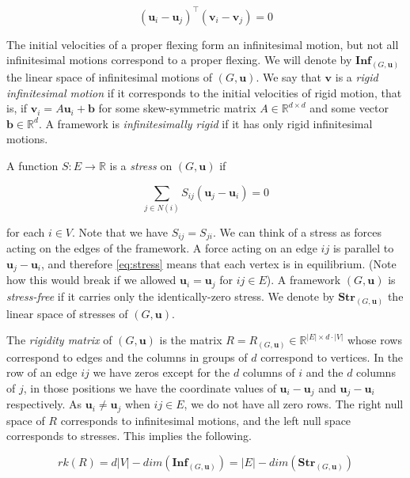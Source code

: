 \documentclass[10pt,a4paper]{article}
\newcommand{\vu}[0]{\mathbf{u}}
\newcommand{\vv}[0]{\mathbf{v}}
\newcommand{\R}[0]{\mathbb{R}}
\begin{document}
\begin{equation}\label{eq:infinitesimal}
    (\vu_i-\vu_j)^\top (\vv_i -\vv_j)=0
\end{equation}

The initial velocities of a proper flexing form an infinitesimal motion, but not all infinitesimal motions correspond to a proper flexing. We will denote by $\mathbf{Inf}_{(G,\vu)}$ the linear space of infinitesimal motions of $(G,\vu)$. We say that $\vv$ is a \emph{rigid infinitesimal motion} if it corresponds to the initial velocities of rigid motion, that is, if $\vv_i=A\vu_i+\mathbf{b}$
for some skew-symmetric matrix $A\in\R^{d\times d}$ and some vector $\mathbf{b}\in\R^d$. A framework is \emph{infinitesimally rigid} if it has only rigid infinitesimal motions. 

A function $S:E\rightarrow \mathbb{R}$ is a \emph{stress} on $(G,\vu)$ if 

\begin{equation}\label{eq:stress}
\sum\limits_{j\in N(i)} S_{ij}(\vu_j-\vu_i)=0  
\end{equation}

for each $i\in V$. Note that we have $S_{ij} = S_{ji}$. We can think of a stress as forces acting on the edges of the framework. A force acting on an edge $ij$ is parallel to $\vu_j-\vu_i$, and therefore \eqref{eq:stress} means that each vertex is in equilibrium. (Note how this would break if we allowed $\vu_i=\vu_j$ for $ij\in E$). A framework $(G,\vu)$ is \emph{stress-free} if it carries only the identically-zero stress. We denote by $\mathbf{Str}_{(G,\vu)}$ the linear space of stresses of $(G,\vu)$.

The \emph{rigidity matrix} of $(G,\vu)$ is the matrix $R=R_{(G,\vu)}\in \R^{|E|\times d\cdot|V|}$ whose rows correspond to edges and the columns in groups of $d$ correspond to vertices. In the row of an edge $ij$ we have zeros except for the $d$ columns of $i$ and the $d$ columns of $j$, in those positions we have the coordinate values of $\vu_i-\vu_j$ and $\vu_j-\vu_i$ respectively. As $\vu_i\neq \vu_j$ when $ij\in E$, we do not have all zero rows. The right null space of $R$ corresponds to infinitesimal motions, and the left null space corresponds to stresses. This implies the following. 

\begin{equation}\label{eq:dimension}
 rk(R) = d|V|-dim(\mathbf{Inf}_{(G,\vu)}) = |E|-dim(\mathbf{Str}_{(G,\vu)})
\end{equation}
 
\end{document}
